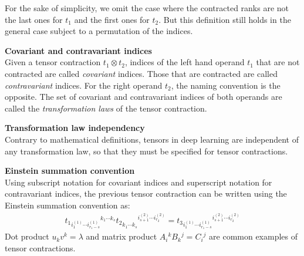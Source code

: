 For the sake of simplicity, we omit the case where the contracted ranks are not the last ones for $t_1$ and the first ones for $t_2$. But this definition still holds in the general case subject to a permutation of the indices.

\begin{definition}\textbf{Covariant and contravariant indices}\\
Given a tensor contraction $t_1 \otimes t_2$, indices of the left hand operand $t_1$ that are not contracted are called \emph{covariant} indices. Those that are contracted are called \emph{contravariant} indices. For the right operand $t_2$, the naming convention is the opposite. 
The set of covariant and contravariant indices of both operands are called the \emph{transformation laws} of the tensor contraction.
\end{definition}

\begin{remark}\textbf{Transformation law independency}\\
Contrary to mathematical definitions, tensors in deep learning are independent of any transformation law, so that they must be specified for tensor contractions.
\end{remark}

\begin{remark}\textbf{Einstein summation convention}\\
Using subscript notation for covariant indices and superscript notation for contravariant indices, the previous tensor contraction can be written using the Einstein summation convention as:
\begin{gather}
t_1 \hspace{0pt}_{i_1^{(1)} \cdots i_{r_1-s}^{(1)} } \hspace{0pt}^{ k_1 \cdots k_s} 
t_2 \hspace{0pt}_{ k_1^{\phantom{(}} \cdots k_s^{\phantom{(}}} \hspace{0pt}^{i_{s+1}^{(2)} \cdots i_{r_2}^{(2)}} =
t_3 \hspace{0pt}_ {i_1^{(1)} \cdots i_{r_1-s}^{(1)} } \hspace{0pt}^{i_{s+1}^{(2)} \cdots i_{r_2}^{(2)}}
\label{indices}
\end{gather}
Dot product $u_k v^k = \lambda $ and matrix product $A_i\hspace{0pt}^k B_k\hspace{0pt}^j = C_i\hspace{0pt}^j$ are common examples of tensor contractions.
\end{remark}

